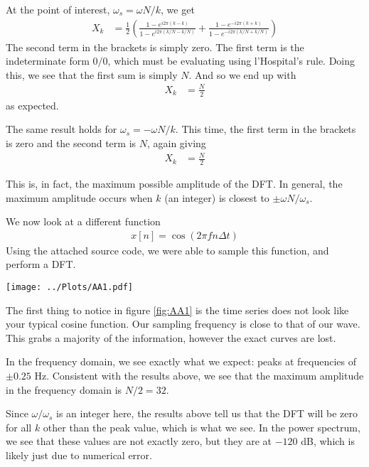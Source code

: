 \documentclass[twocolumn]{myarticle}
\begin{document}
At the point of interest, $ \omega_s = \omega N / k $, we get
\begin{align}
    X_{k} &= \frac{1}{2} \left( \frac{1 - e^{i 2 \pi (k - k)}}{1 - e^{i 2 \pi (k/N - k/N)}} + \frac{1 - e^{-i 2 \pi (k + k)}}{1 - e^{-i 2 \pi (k/N + k/N)}} \right)
\end{align}
The second term in the brackets is simply zero.
The first term is the indeterminate form $ 0/0 $, which must be evaluating using l'Hospital's rule.
Doing this, we see that the first sum is simply $ N $.
And so we end up with
\begin{align}
    X_k &= \frac{N}{2}
\end{align}
as expected.

The same result holds for $ \omega_s = -\omega N / k $.
This time, the first term in the brackets is zero and the second term is $ N $, again giving
\begin{align}
    X_k &= \frac{N}{2}
\end{align}

This is, in fact, the maximum possible amplitude of the DFT.
In general, the maximum amplitude occurs when $ k $ (an integer) is closest to $ \pm \omega N / \omega_s $.

We now look at a different function 
\begin{align}
    x[n] = \cos\left(2\pi f n\Delta t\right)
\end{align}
Using the attached source code, we were able to sample this function, and perform a DFT.

\begin{figure*}[htb]
    \centering
    \texttt{[image: ../Plots/AA1.pdf]}
    \caption{%
        DFT of $x[n]=\cos(2\pi fn\Delta t)$. Top figure showing the sampled time series, the middle showing the DFT, and the bottom displaying the power in dB.
    }
    \label{fig:AA1}
\end{figure*}

The first thing to notice in figure \ref{fig:AA1} is the time series does not look like your typical cosine function. 
Our sampling frequency is close to that of our wave. 
This grabs a majority of the information, however the exact curves are lost. 

In the frequency domain, we see exactly what we expect: peaks at frequencies of $ \pm 0.25 $ Hz. 
Consistent with the results above, we see that the maximum amplitude in the frequency domain is $ N/2 = 32 $.

Since $ \omega/\omega_s $ is an integer here, the results above tell us that the DFT will be zero for all $ k $ other than the peak value, which is what we see.
In the power spectrum, we see that these values are not exactly zero, but they are at $ -120 $ dB, which is likely just due to numerical error.
\end{document}
